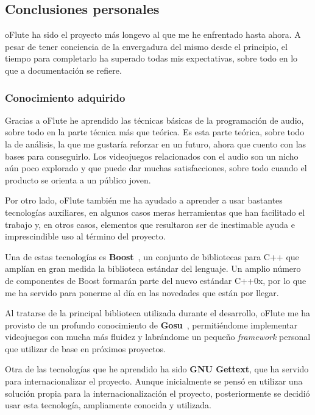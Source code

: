 \documentclass[a4paper,11pt]{article}
\begin{document}
\subsection{Conclusiones personales}

oFlute ha sido el proyecto más longevo al que me he enfrentado hasta ahora. A
pesar de tener conciencia de la envergadura del mismo desde el principio, el
tiempo para completarlo ha superado todas mis expectativas, sobre todo en lo que
a documentación se refiere. 

\subsubsection{Conocimiento adquirido}

Gracias a oFlute he aprendido las técnicas básicas de la programación de audio,
sobre todo en la parte técnica más que teórica. Es esta parte teórica, sobre
todo la de análisis, la que me gustaría reforzar en un futuro, ahora que cuento
con las bases para conseguirlo. Los videojuegos relacionados con el audio
son un nicho aún poco explorado y que puede dar muchas satisfacciones, sobre
todo cuando el producto se orienta a un público joven.

Por otro lado, oFlute también me ha ayudado a aprender a usar bastantes
tecnologías auxiliares, en algunos casos meras herramientas que han facilitado
el trabajo y, en otros casos, elementos que resultaron ser de inestimable ayuda
e imprescindible uso al término del proyecto.

Una de estas tecnologías es \textbf{Boost}~\cite{boost}, un conjunto de
bibliotecas para C++ que amplían en gran medida la biblioteca estándar del
lenguaje. Un amplio número de componentes de Boost formarán parte del nuevo
estándar C++0x, por lo que me ha servido para ponerme al día en las novedades
que están por llegar.

Al tratarse de la principal biblioteca utilizada durante el desarrollo, oFlute
me ha provisto de un profundo conocimiento de \textbf{Gosu}~\cite{gosu},
permitiéndome implementar videojuegos con mucha más fluidez y labrándome un
pequeño \textit{framework} personal que utilizar de base en próximos
proyectos. 

Otra de las tecnologías que he aprendido ha sido \textbf{GNU Gettext}, que ha
servido para internacionalizar el proyecto. Aunque inicialmente se pensó en
utilizar una solución propia para la internacionalización el proyecto,
posteriormente se decidió usar esta tecnología, ampliamente conocida y
utilizada.
\end{document}
